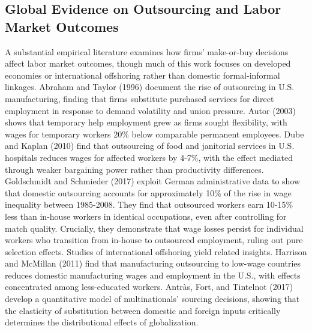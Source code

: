 \subsection{Global Evidence on Outsourcing and Labor Market Outcomes} 
A substantial empirical literature examines how firms' make-or-buy decisions affect labor market outcomes, though much of this work focuses on developed economies or international offshoring rather than domestic formal-informal linkages.
Abraham and Taylor (1996) document the rise of outsourcing in U.S. manufacturing, finding that firms substitute purchased services for direct employment in response to demand volatility and union pressure. Autor (2003) shows that temporary help employment grew as firms sought flexibility, with wages for temporary workers 20\% below comparable permanent employees. Dube and Kaplan (2010) find that outsourcing of food and janitorial services in U.S. hospitals reduces wages for affected workers by 4-7\%, with the effect mediated through weaker bargaining power rather than productivity differences.
Goldschmidt and Schmieder (2017) exploit German administrative data to show that domestic outsourcing accounts for approximately 10\% of the rise in wage inequality between 1985-2008. They find that outsourced workers earn 10-15\% less than in-house workers in identical occupations, even after controlling for match quality. Crucially, they demonstrate that wage losses persist for individual workers who transition from in-house to outsourced employment, ruling out pure selection effects.
Studies of international offshoring yield related insights. Harrison and McMillan (2011) find that manufacturing outsourcing to low-wage countries reduces domestic manufacturing wages and employment in the U.S., with effects concentrated among less-educated workers. Antràs, Fort, and Tintelnot (2017) develop a quantitative model of multinationals' sourcing decisions, showing that the elasticity of substitution between domestic and foreign inputs critically determines the distributional effects of globalization.
